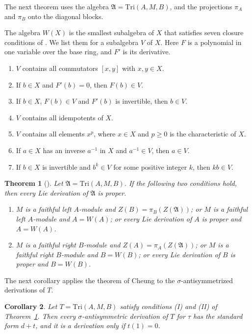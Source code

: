 \documentclass[]{interact}
\theoremstyle{plain}
\newtheorem{theorem}{Theorem}[section]
\newtheorem{corollary}[theorem]{Corollary}
\theoremstyle{definition}
\theoremstyle{remark}
\begin{document}
The next theorem uses the algebra $\mathfrak{A} = \mathrm{Tri}(A,M,B)$, and the projections $\pi_A$ and $\pi_B$ onto the diagonal blocks.

The algebra $W(X)$ is the smallest subalgebra of $X$ that satisfies seven closure conditions of \citet[Proposition 10]{Cheung2003}.
We list them for a subalgebra $V$ of $X$.
Here $F$ is a polynomial in one variable over the base ring, and $F'$ is its derivative.
\begin{enumerate}[label=(\roman*)]
\item $V$ contains all commutators $[x, y]$ with $x, y \in X$.
\item If $b \in X$ and $F'(b) = 0$, then $F(b) \in V$.
\item If $b \in X$, $F(b) \in V$ and $F'(b)$ is invertible, then $b \in V$.
\item $V$ contains all idempotents of $X$.
\item $V$ contains all elements $x^p$, where $x \in X$ and $p \geq 0$ is the characteristic of $X$.
\item If $a \in X$ has an inverse $a^{-1}$ in $X$ and $a^{-1} \in V$, then $a \in V$.
\item If $b \in X$ is invertible and $b^k \in V$ for some positive integer $k$, then $kb \in V$.
\end{enumerate}

\begin{theorem}[{\citep[Theorem 11]{Cheung2003}}]\label{thm:cheung}
Let $\mathfrak{A} = \mathrm{Tri}(A, M, B)$. If the following two conditions hold, then every Lie derivation of $\mathfrak{A}$ is proper.
\begin{enumerate}[label=(\Roman*)]
\item $M$ is a faithful left $A$-module and $Z(B) = \pi_B(Z(\mathfrak{A}))$; or $M$ is a faithful left $A$-module and $A = W(A)$; or every Lie derivation of $A$ is proper and $A = W(A)$.
\item $M$ is a faithful right $B$-module and $Z(A) = \pi_A(Z(\mathfrak{A}))$; or $M$ is a faithful right $B$-module and $B = W(B)$; or every Lie derivation of $B$ is proper and $B = W(B)$.
\end{enumerate}
\end{theorem}

The next corollary applies the theorem of Cheung to the $\sigma$-antisymmetrized derivations of $T$. %

\begin{corollary}\label{cor:triangular-lie}
Let $T = \mathrm{Tri}(A,M,B)$ satisfy conditions (I) and (II) of Theorem~\ref{thm:cheung}. Then every $\sigma$-antisymmetric derivation of $T$ for $\tau$ has the standard form $d + t$, and it is a derivation only if $t(1) = 0$.
\end{corollary}
\end{document}

